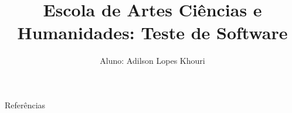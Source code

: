 \documentclass[compress, hyperref={pdfpagelayout=SinglePage}]{beamer}
\title[SIN5022]{Escola de Artes Ciências e Humanidades: Teste de Software}
\author{Aluno: Adilson Lopes Khouri}
\begin{document}
	\begin{frame}
		\titlepage
	\end{frame}
	
	
	
	
	
	

	
		
	
	
	

	

	

	\begin{frame}{}
		\begin{block}{Referências}
			\tiny
			\nocite{*}
			
	    		
		\end{block}
	\end{frame}
\end{document}
